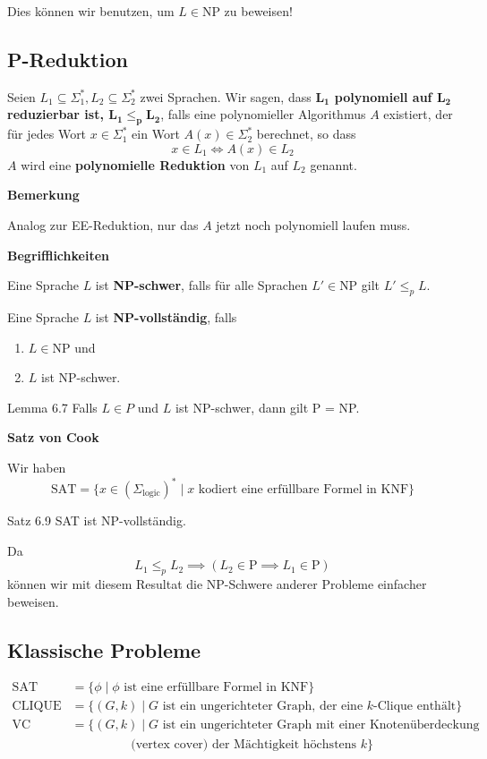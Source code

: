 \documentclass[a4paper, 11pt]{article}
\newcommand\myTitle[1]{{\large \textbf {#1}}}
\begin{document}
	Dies können wir benutzen, um $L \in \text{NP}$ zu beweisen!

\subsection{P-Reduktion}
	\begin{mainbox}{}
		Seien $L_1 \subseteq \Sigma_1^*, L_2 \subseteq \Sigma_2^*$ zwei Sprachen. 
		Wir sagen, dass \textbf{$\mathbf{L_1}$ polynomiell auf $\mathbf{L_2}$ reduzierbar 
		ist, $\mathbf{L_1 \leq_{p} L_2}$}, falls eine polynomieller Algorithmus $A$ existiert, 
		der für jedes Wort $x \in \Sigma_1^*$ ein Wort $A(x) \in \Sigma_2^*$ berechnet, so dass
		$$x \in L_1 \iff A(x) \in L_2$$
		$A$ wird eine \textbf{polynomielle Reduktion} von $L_1$ auf $L_2$ genannt. 
	\end{mainbox}
	\textbf{Bemerkung} 
    
    Analog zur EE-Reduktion, nur das $A$ jetzt noch polynomiell laufen muss.

\myTitle{Begrifflichkeiten}
	\begin{mainbox}{}
		Eine Sprache $L$ ist \textbf{NP-schwer}, falls für alle Sprachen $L' \in $NP gilt $L' \leq_p L$.

		Eine Sprache $L$ ist \textbf{NP-vollständig}, falls
		\begin{enumerate}[label=(\roman*)]
			\item $L \in $NP und
			\item $L$ ist NP-schwer.
		\end{enumerate}
	\end{mainbox}
	\begin{mainbox}{Lemma 6.7}
		Falls $L \in P$ und $L$ ist NP-schwer, dann gilt P = NP.
	\end{mainbox}


\myTitle{Satz von Cook}

	Wir haben 
	$$\text{SAT} = \{x \in (\Sigma_{\text{logic}})^* \mid x \text{ kodiert eine erfüllbare Formel in KNF}\}$$

	\begin{mainbox}{Satz 6.9}
		SAT ist NP-vollständig.
	\end{mainbox}
	Da $$L_1 \leq_{p} L_2 \implies (L_2 \in \text{P} \implies L_1 \in \text{P})$$
	können wir mit diesem Resultat die NP-Schwere anderer Probleme einfacher beweisen.


\subsection{Klassische Probleme}
	\begin{align*}
		\text{SAT} &= \{\phi \mid \phi \text{ ist eine erfüllbare Formel in KNF}\}\\
		\text{CLIQUE} &= \{(G, k) \mid G \text{ ist ein ungerichteter Graph, der eine $k$-Clique enthält}\}\\
		\text{VC} &= \{(G, k) \mid G \text{ ist ein ungerichteter Graph mit einer Knotenüberdeckung}\\ 
		 & \hspace{2cm}\text{(vertex cover) der Mächtigkeit höchstens }k\}
	\end{align*}
	
\end{document}
